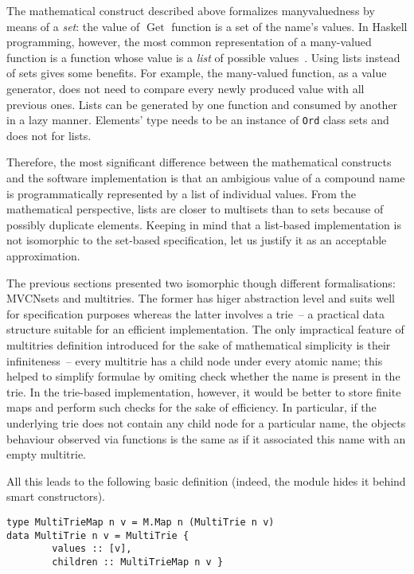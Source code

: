 \documentclass{article}
\theoremstyle{definition}
\newcommand{\deref}{\operatorname{Get}}
\begin{document}
The mathematical construct described above formalizes manyvaluedness by means
of a \emph{set}: the value of $\deref$ function is a set of the name's values.
In Haskell programming, however, the most common representation of a many-valued
function is a function whose value is a \emph{list} of possible
values~\cite[p.~285]{bib:lipovaca}.  Using lists instead of sets gives some
benefits. For example, the many-valued function, as a value generator, does not
need to compare every newly produced value with all previous ones. Lists can be
generated by one function and consumed by another in a lazy manner. Elements'
type needs to be an instance of \lstinline{Ord} class sets and does not for
lists.

Therefore, the most significant difference between the mathematical constructs
and the software implementation is that an ambigious value of a compound name is
programmatically represented by a list of individual values.  From the
mathematical perspective, lists are closer to multisets than to sets because of
possibly duplicate elements.  Keeping in mind that a list-based implementation
is not isomorphic to the set-based specification, let us justify it as an
acceptable approximation.

The previous sections presented two isomorphic though different formalisations:
MVCNsets and multitries. The former has higer abstraction level and suits well
for specification purposes whereas the latter involves a trie~-- a practical
data structure suitable for an efficient implementation. The only impractical
feature of multitries definition introduced for the sake of mathematical
simplicity is their infiniteness~-- every multitrie has a child node under
every atomic name; this helped to simplify formulae by omiting check whether the
name is present in the trie.  In the trie-based implementation, however, it would be
better to store finite maps and perform such checks for the sake of efficiency.
In particular, if the underlying trie does not contain any child node for a
particular name, the objects behaviour observed via functions is the same as if
it associated this name with an empty multitrie.

All this leads to the following basic definition (indeed, the module hides it
behind smart constructors).

\begin{lstlisting}
type MultiTrieMap n v = M.Map n (MultiTrie n v) 
data MultiTrie n v = MultiTrie {
        values :: [v],
        children :: MultiTrieMap n v }
\end{lstlisting}
\end{document}

